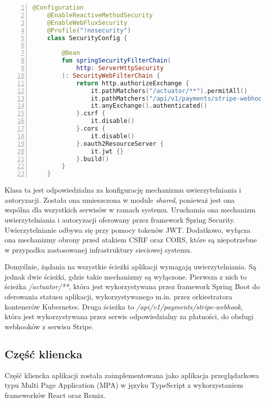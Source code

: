 \begin{lstlisting}[caption={Kod klasy konfigurującej mechanizm uwierzytelniania i autoryzacji},label={lst:server-shared},captionpos=b,language=Kotlin,numbers=left,showstringspaces=false]
    @Configuration
    @EnableReactiveMethodSecurity
    @EnableWebFluxSecurity
    @Profile("!nosecurity")
    class SecurityConfig {
    
        @Bean
        fun springSecurityFilterChain(
            http: ServerHttpSecurity
        ): SecurityWebFilterChain {
            return http.authorizeExchange {
                it.pathMatchers("/actuator/**").permitAll()
                it.pathMatchers("/api/v1/payments/stripe-webhook").permitAll()
                it.anyExchange().authenticated()
            }.csrf {
                it.disable()
            }.cors {
                it.disable()
            }.oauth2ResourceServer {
                it.jwt {}
            }.build()
        }
    }
\end{lstlisting}

Klasa ta jest odpowiedzialna za konfigurację mechanizmu uwierzytelniania i autoryzacji. Została ona umieszczona w module \textit{shared}, ponieważ jest ona wspólna dla wszystkich serwisów w ramach systemu. Uruchamia ona mechanizm uwierzytelniania i autoryzacji oferowany przez framework Spring Security. Uwierzytelnianie odbywa się przy pomocy tokenów JWT. Dodatkowo, wyłącza ona mechanizmy obrony przed atakiem CSRF oraz CORS, które są niepotrzebne w przypadku zastosowanej infrastruktury sieciowej systemu.

Domyślnie, żądania na wszystkie ścieżki aplikacji wymagają uwierzytelniania. Są jednak dwie ścieżki, gdzie takie mechanizmy są wyłączone. Pierwsza z nich to ścieżka \textit{/actuator/**}, która jest wykorzystywana przez framework Spring Boot do oferowania statusu aplikacji, wykorzystywanego m.in. przez orkiestratora kontenerów Kubernetes. Druga ścieżka to \textit{/api/v1/payments/stripe-webhook}, która jest wykorzystywana przez serwis odpowiedzialny za płatności, do obsługi webhooków z serwisu Stripe.

\subsection{Część kliencka}

Część kliencka aplikacji została zaimplementowana jako aplikacja przeglądarkowa typu Multi Page Application (MPA) w języku TypeScript z wykorzystaniem frameworków React oraz Remix.

